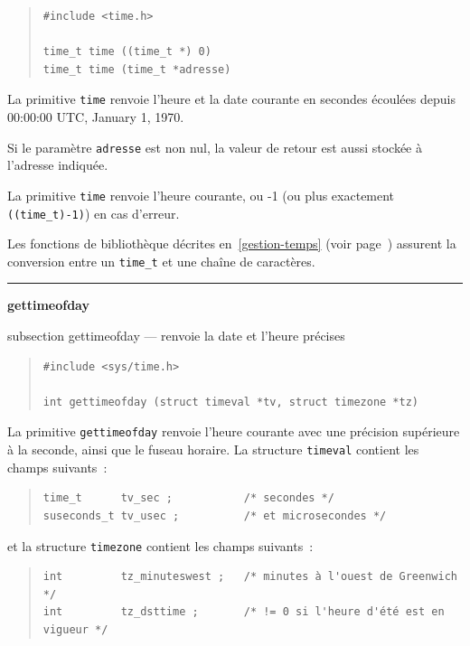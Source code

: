 \documentclass [twoside] {report}
\newcommand {\primitive} [1]
    {
	\phantomsection
	{\large \textbf {#1}}
	\addcontentsline {toc} {subsection} {#1}
    }
\newcommand {\separation}
    {
	\vspace {5mm}
	\nopagebreak
	\hrule
    }
\begin{document}
\begin {quote}
\begin {verbatim}
#include <time.h>

time_t time ((time_t *) 0)
time_t time (time_t *adresse)
\end{verbatim}
\end {quote}

La primitive \texttt {time} renvoie l'heure et la date
courante en secondes écoulées depuis
00:00:00 UTC, January 1, 1970.

Si le paramètre \texttt {adresse} est non nul, la valeur
de retour est aussi stockée à l'adresse
indiquée.

La primitive \texttt {time} renvoie l'heure courante, ou -1 (ou plus
exactement \verb|((time_t)-1)|) en cas d'erreur.

Les fonctions de bibliothèque décrites en~\ref {gestion-temps} (voir
page~\pageref {gestion-temps}) assurent la conversion entre un \texttt
{time\_t} et une chaîne de caractères.


\separation
\primitive {gettimeofday} --- renvoie la date et l'heure précises
    \label {gettimeofday}

\begin {quote}
\begin {verbatim}
#include <sys/time.h>

int gettimeofday (struct timeval *tv, struct timezone *tz)
\end{verbatim}
\end {quote}


La primitive \texttt {gettimeofday} renvoie l'heure courante avec une
précision supérieure à la seconde, ainsi que le fuseau horaire. La
structure \texttt {timeval} contient les champs suivants~:
\begin {quote}
\begin {verbatim}
time_t      tv_sec ;           /* secondes */
suseconds_t tv_usec ;          /* et microsecondes */
\end{verbatim}
\end {quote}
et la structure \texttt {timezone} contient les champs suivants~:
\begin {quote}
\begin {verbatim}
int         tz_minuteswest ;   /* minutes à l'ouest de Greenwich */
int         tz_dsttime ;       /* != 0 si l'heure d'été est en vigueur */
\end{verbatim}
\end {quote}
\end{document}
